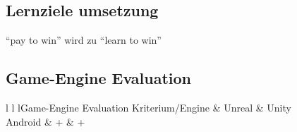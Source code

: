 \subsection{Lernziele umsetzung}
	\enquote{pay to win} wird zu \enquote{learn to win}
\subsection{Game-Engine Evaluation}\label{ssec:engineeval}
	\begin{tabl}{l l l}{Game-Engine Evaluation}
		\toprule
			Kriterium/Engine & Unreal & Unity \\
		\midrule
			Android & + & + \\
		\bottomrule
	\end{tabl}
